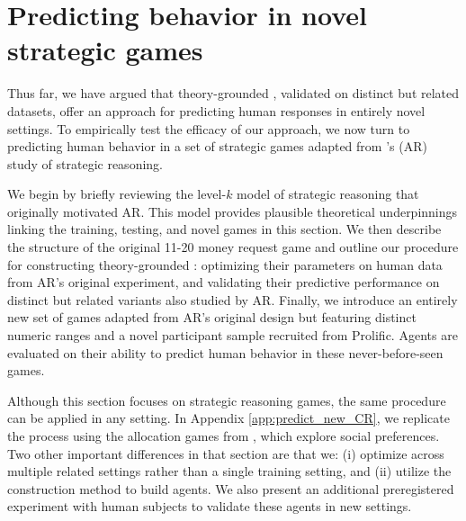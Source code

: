 \section{Predicting behavior in novel strategic games}
\label{sec:predict_new_AR}

Thus far, we have argued that theory-grounded , validated on distinct but related datasets, offer an approach for predicting human responses in entirely novel settings.
To empirically test the efficacy of our approach, we now turn to predicting human behavior in a set of strategic games adapted from \cite{1120Arad2012}'s (AR) study of strategic reasoning.

We begin by briefly reviewing the level-$k$ model of strategic reasoning that originally motivated AR. 
This model provides plausible theoretical underpinnings linking the training, testing, and novel games in this section.
We then describe the structure of the original 11-20 money request game and outline our procedure for constructing theory-grounded : optimizing their parameters on human data from AR's original experiment, and validating their predictive performance on distinct but related variants also studied by AR.
Finally, we introduce an entirely new set of games adapted from AR's original design but featuring distinct numeric ranges and a novel participant sample recruited from Prolific. 
Agents are evaluated on their ability to predict human behavior in these never-before-seen games. 

Although this section focuses on strategic reasoning games, the same procedure can be applied in any setting.
In Appendix \ref{app:predict_new_CR}, we replicate the process using the allocation games from \cite{charness2002understanding}, which explore social preferences.
Two other important differences in that section are that we: (i) optimize across multiple related settings rather than a single training setting, and (ii) utilize the construction method to build agents.
We also present an additional preregistered experiment with human subjects to validate these agents in new settings.

